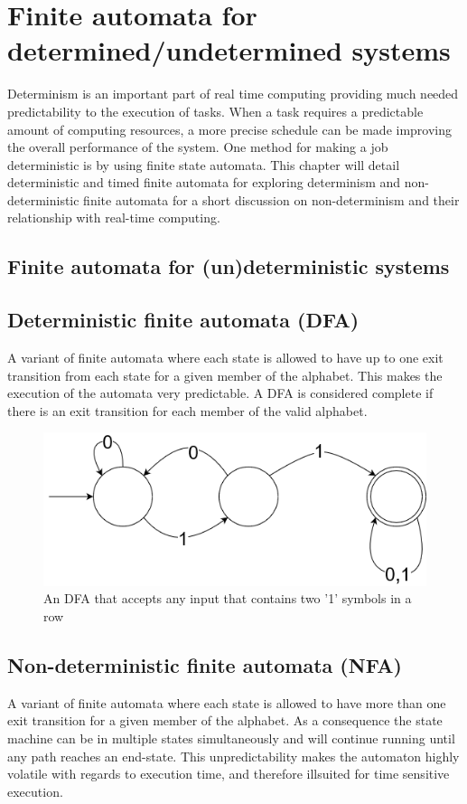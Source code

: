 \section{Finite automata for determined/undetermined systems} \label{sc:determinism}

Determinism is an important part of real time computing providing much needed predictability to the execution of tasks. When a task requires a predictable amount of computing resources, a more precise schedule can be made improving the overall performance of the system. One method for making a job deterministic is by using finite state automata. This chapter will detail deterministic and timed finite automata for exploring determinism and non-deterministic finite automata for a short discussion on non-determinism and their relationship with real-time computing. 

\subsection{Finite automata for (un)deterministic systems}

\subsection{Deterministic finite automata (DFA)}
A variant of finite automata where each state is allowed to have up to one exit transition from each state for a given member of the alphabet. This makes the execution of the automata very predictable. A DFA is considered complete if there is an exit transition for each member of the valid alphabet. 

\begin{figure}[h!]\label{}
    \centering
    \includegraphics[scale=0.5]{realTimeComputing/fig/DFA.png}
    \caption{An DFA that accepts any input that contains two '1' symbols in a row}
    \label{fig:dfaSample}
\end{figure}

\subsection{Non-deterministic finite automata (NFA)}
A variant of finite automata where each state is allowed to have more than one exit transition for a given member of the alphabet. As a consequence the state machine can be in multiple states simultaneously and will continue running until any path reaches an end-state. This unpredictability makes the automaton highly volatile with regards to execution time, and therefore illsuited for time sensitive execution.\par

